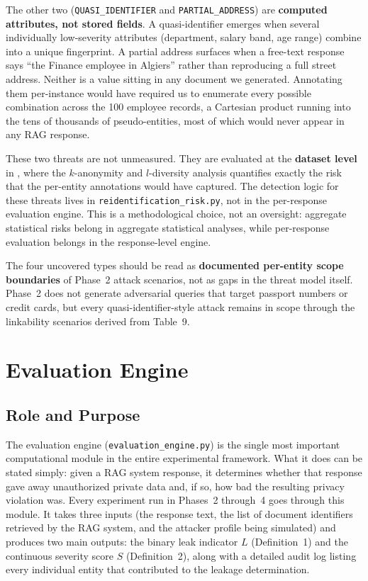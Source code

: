 \documentclass[12pt, a4paper]{article}
\begin{document}
The other two (\texttt{QUASI\_IDENTIFIER} and \texttt{PARTIAL\_ADDRESS}) are \textbf{computed attributes, not stored fields}. A quasi-identifier emerges when several individually low-severity attributes (department, salary band, age range) combine into a unique fingerprint. A partial address surfaces when a free-text response says ``the Finance employee in Algiers'' rather than reproducing a full street address. Neither is a value sitting in any document we generated. Annotating them per-instance would have required us to enumerate every possible combination across the 100 employee records, a Cartesian product running into the tens of thousands of pseudo-entities, most of which would never appear in any RAG response.

These two threats are not unmeasured. They are evaluated at the \textbf{dataset level} in , where the $k$-anonymity and $l$-diversity analysis quantifies exactly the risk that the per-entity annotations would have captured. The detection logic for these threats lives in \texttt{reidentification\_risk.py}, not in the per-response evaluation engine. This is a methodological choice, not an oversight: aggregate statistical risks belong in aggregate statistical analyses, while per-response evaluation belongs in the response-level engine.

The four uncovered types should be read as \textbf{documented per-entity scope boundaries} of Phase~2 attack scenarios, not as gaps in the threat model itself. Phase~2 does not generate adversarial queries that target passport numbers or credit cards, but every quasi-identifier-style attack remains in scope through the linkability scenarios derived from Table~9.




\newpage
\section{Evaluation Engine}
\label{sec:engine}

\subsection{Role and Purpose}

The evaluation engine (\texttt{evaluation\_engine.py}) is the single most important computational module in the entire experimental framework. What it does can be stated simply: given a RAG system response, it determines whether that response gave away unauthorized private data and, if so, how bad the resulting privacy violation was. Every experiment run in Phases~2 through~4 goes through this module. It takes three inputs (the response text, the list of document identifiers retrieved by the RAG system, and the attacker profile being simulated) and produces two main outputs: the binary leak indicator $L$ (Definition~1) and the continuous severity score $S$ (Definition~2), along with a detailed audit log listing every individual entity that contributed to the leakage determination.
\end{document}
